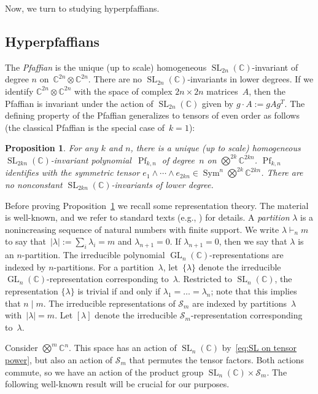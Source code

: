 \documentclass[10pt,a4paper]{article}
\newtheorem{proposition}[theorem]{Proposition}
\newcommand{\C}{\mathbb C}
\newcommand{\SL}{\operatorname{SL}}
\newcommand{\GL}{\operatorname{GL}}
\newcommand{\Sym}{\operatorname{Sym}}
\newcommand{\tensor}{\textstyle\bigotimes}
\DeclareMathOperator{\Pf}{Pf}
\newcommand{\la}{\lambda}
\begin{document}
Now, we turn to studying hyperpfaffians.





%
%
%
%

%
%
%
%
%
%
%

%
\subsection{Hyperpfaffians}
%
The \emph{Pfaffian} is the unique (up to scale) homogeneous $\SL_{2n}(\C)$-invariant of degree $n$ on~$\C^{2n}\otimes\C^{2n}$.
There are no $\SL_{2n}(\C)$-invariants in lower degrees.
%
If we identify $\C^{2n} \otimes \C^{2n}$ with the space of complex $2n\times 2n$ matrices~$A$, then the Pfaffian is invariant under the action of $\SL_{2n}(\C)$ given by $g \cdot A := gAg^T$.
The defining property of the Pfaffian generalizes to tensors of even order as follows (the classical Pfaffian is the special case of~$k=1$):

\begin{proposition}\label{pro:nolowerdegreeinv}
For any $k$ and $n$, there is a unique (up to scale) homogeneous $\SL_{2kn}(\C)$-in\-va\-ri\-ant polynomial~$\Pf_{k,n}$ of degree~$n$ on $\tensor^{2k} \C^{2kn}$.
$\Pf_{k,n}$ identifies with the symmetric tensor $e_1 \wedge \cdots \wedge e_{2kn} \in \Sym^n \tensor^{2k}\C^{2kn}$.
There are no nonconstant $\SL_{2kn}(\C)$-invariants of lower degree.
\end{proposition}

\noindent
Before proving Proposition~\ref{pro:nolowerdegreeinv} we recall some representation theory.
The material is well-known, and we refer to standard texts (e.g., \cite{FH}) for details.
A \emph{partition} $\la$ is a nonincreasing sequence of natural numbers with finite support.
We write $\la \vdash_n m$ to say that~$|\la| := \sum_i \la_i = m$ and $\la_{n+1}=0$.
If $\la_{n+1}=0$, then we say that $\la$ is an $n$-partition.
The irreducible polynomial $\GL_n(\C)$-representations are indexed by $n$-partitions.
For a partition~$\la$, let~$\{\la\}$ denote the irreducible $\GL_n(\C)$-representation corresponding to~$\la$.
Restricted to $\SL_n(\C)$, the representation $\{\la\}$ is trivial if and only if $\la_1=\ldots=\la_n$; note that this implies that $n \mid m$.
The irreducible representations of $\mathcal{S}_m$ are indexed by partitions~$\la$ with~$|\la|=m$.
Let $[\la]$ denote the irreducible $\mathcal{S}_m$-representation corresponding to~$\la$.
%

Consider $\tensor^m \C^n$. This space has an action of $\SL_n(\C)$ by~\eqref{eq:SL on tensor power}, but also an action of $\mathcal{S}_m$ that permutes the tensor factors.
Both actions commute, so we have an action of the product group $\SL_n(\C)\times\mathcal S_m$. The following well-known result will be crucial for our purposes.
\end{document}

